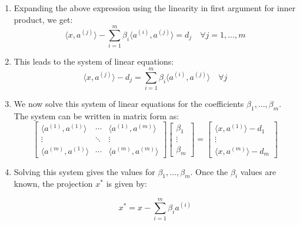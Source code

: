 \begin{derivation}
\begin{enumerate}
        \item Expanding the above expression using the linearity in first argument for inner product, we get:
        \[
        \langle x, a^{(j)} \rangle - \sum_{i=1}^{m} \beta_i \langle a^{(i)}, a^{(j)} \rangle = d_j \quad \forall j = 1, \dots, m
        \]
        
        \item This leads to the system of linear equations:
        \[
        \langle x, a^{(j)} \rangle - d_j = \sum_{i=1}^{m} \beta_i \langle a^{(i)}, a^{(j)} \rangle \quad \forall j
        \]
        
        \item We now solve this system of linear equations for the coefficients $\beta_1, \dots, \beta_m$. The system can be written in matrix form as:
        \[
        \begin{bmatrix}
        \langle a^{(1)}, a^{(1)} \rangle & \cdots & \langle a^{(1)}, a^{(m)} \rangle \\
        \vdots & \ddots & \vdots \\
        \langle a^{(m)}, a^{(1)} \rangle & \cdots & \langle a^{(m)}, a^{(m)} \rangle
        \end{bmatrix}
        \begin{bmatrix}
        \beta_1 \\
        \vdots \\
        \beta_m
        \end{bmatrix}
        =
        \begin{bmatrix}
        \langle x, a^{(1)} \rangle - d_1 \\
        \vdots \\
        \langle x, a^{(m)} \rangle - d_m
        \end{bmatrix}
        \]
        
        \item Solving this system gives the values for $\beta_1, \dots, \beta_m$. Once the $\beta_i$ values are known, the projection $x^*$ is given by:
        
        \[
        x^* = x - \sum_{i=1}^{m} \beta_i a^{(i)} 
        \]
    \end{enumerate}            
\end{derivation}

